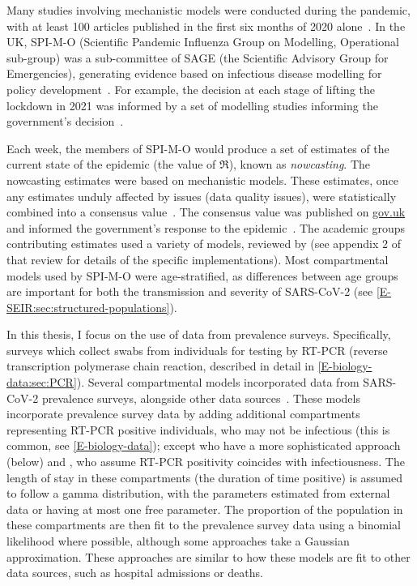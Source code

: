 \documentclass[thesis.tex]{subfiles}
\begin{document}
Many studies involving mechanistic models were conducted during the pandemic, with at least 100 articles published in the first six months of 2020 alone~\autocite{shankarSystematic}.
In the UK, SPI-M-O (Scientific Pandemic Influenza Group on Modelling, Operational sub-group) was a sub-committee of SAGE (the Scientific Advisory Group for Emergencies), generating evidence based on infectious disease modelling for policy development~\autocite{medleySPIM,govSPIMO}.
For example, the decision at each stage of lifting the lockdown in 2021 was informed by a set of modelling studies informing the government's decision~\autocite{sageEvidence}.

Each week, the members of SPI-M-O would produce a set of estimates of the current state of the epidemic (\eg the value of $\Re$), known as \emph{nowcasting}.
The nowcasting estimates were based on mechanistic models.
These estimates, once any estimates unduly affected by issues (\eg data quality issues), were statistically combined into a consensus value~\autocite{parkCombining}.
The consensus value was published on \url{gov.uk} and informed the government's response to the epidemic~\autocite{govRnumber}.
The academic groups contributing estimates used a variety of models, reviewed by \textcite{royalSocietyRnumber} (see appendix 2 of that review for details of the specific implementations).
Most compartmental models used by SPI-M-O were age-stratified, as differences between age groups are important for both the transmission and severity of SARS-CoV-2 (see \cref{E-SEIR:sec:structured-populations}).

In this thesis, I focus on the use of data from prevalence surveys.
Specifically, surveys which collect swabs from individuals for testing by RT-PCR (reverse transcription polymerase chain reaction, described in detail in \cref{E-biology-data:sec:PCR}).
Several compartmental models incorporated data from SARS-CoV-2 prevalence surveys, alongside other data sources~\autocite{daviesAssociation,ironsEstimating,knockKey,nicholsonImproving,pooleyEstimation,birrellRTM2}.
These models incorporate prevalence survey data by adding additional compartments representing RT-PCR positive individuals, who may not be infectious (this is common, see \cref{E-biology-data}); except \textcite{nicholsonImproving} who have a more sophisticated approach (below) and \textcite{ironsEstimating}, who assume RT-PCR positivity coincides with infectiousness.
The length of stay in these compartments (the duration of time positive) is assumed to follow a gamma distribution, with the parameters estimated from external data or having at most one free parameter.
The proportion of the population in these compartments are then fit to the prevalence survey data using a binomial likelihood where possible, although some approaches take a Gaussian approximation.
These approaches are similar to how these models are fit to other data sources, such as hospital admissions or deaths.
\end{document}
